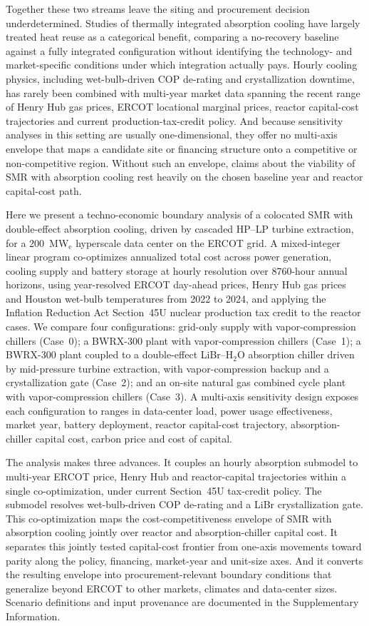\documentclass[a4paper,fleqn]{cas-sc}
\begin{document}
Together these two streams leave the siting and procurement decision underdetermined. Studies of thermally integrated absorption cooling have largely treated heat reuse as a categorical benefit, comparing a no-recovery baseline against a fully integrated configuration without identifying the technology- and market-specific conditions under which integration actually pays. Hourly cooling physics, including wet-bulb-driven COP de-rating and crystallization downtime, has rarely been combined with multi-year market data spanning the recent range of Henry Hub gas prices, ERCOT locational marginal prices, reactor capital-cost trajectories and current production-tax-credit policy. And because sensitivity analyses in this setting are usually one-dimensional, they offer no multi-axis envelope that maps a candidate site or financing structure onto a competitive or non-competitive region. Without such an envelope, claims about the viability of SMR with absorption cooling rest heavily on the chosen baseline year and reactor capital-cost path.

Here we present a techno-economic boundary analysis of a colocated SMR with double-effect absorption cooling, driven by cascaded HP--LP turbine extraction, for a 200~MW$_\mathrm{e}$ hyperscale data center on the ERCOT grid. A mixed-integer linear program co-optimizes annualized total cost across power generation, cooling supply and battery storage at hourly resolution over 8760-hour annual horizons, using year-resolved ERCOT day-ahead prices, Henry Hub gas prices and Houston wet-bulb temperatures from 2022 to 2024, and applying the Inflation Reduction Act Section~45U nuclear production tax credit to the reactor cases. We compare four configurations: grid-only supply with vapor-compression chillers (Case~0); a BWRX-300 plant with vapor-compression chillers (Case~1); a BWRX-300 plant coupled to a double-effect LiBr--H$_2$O absorption chiller driven by mid-pressure turbine extraction, with vapor-compression backup and a crystallization gate (Case~2); and an on-site natural gas combined cycle plant with vapor-compression chillers (Case~3). A multi-axis sensitivity design exposes each configuration to ranges in data-center load, power usage effectiveness, market year, battery deployment, reactor capital-cost trajectory, absorption-chiller capital cost, carbon price and cost of capital.

The analysis makes three advances. It couples an hourly absorption submodel to multi-year ERCOT price, Henry Hub and reactor-capital trajectories within a single co-optimization, under current Section~45U tax-credit policy. The submodel resolves wet-bulb-driven COP de-rating and a LiBr crystallization gate. This co-optimization maps the cost-competitiveness envelope of SMR with absorption cooling jointly over reactor and absorption-chiller capital cost. It separates this jointly tested capital-cost frontier from one-axis movements toward parity along the policy, financing, market-year and unit-size axes. And it converts the resulting envelope into procurement-relevant boundary conditions that generalize beyond ERCOT to other markets, climates and data-center sizes. Scenario definitions and input provenance are documented in the Supplementary Information.
\end{document}
